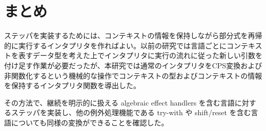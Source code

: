 \section{まとめ}
\label{section:conclusion}

ステッパを実装するためには、コンテキストの情報を保持しながら部分式を再帰的に実行するインタプリタを作ればよい。以前の研究\cite{FCA19}では言語ごとにコンテキストを表すデータ型を考えた上でインタプリタに実行の流れに従った新しい引数を付け足す作業が必要だったが、本研究では通常のインタプリタをCPS変換および非関数化するという機械的な操作でコンテキストの型およびコンテキストの情報を保持するインタプリタ関数を導出した。

その方法で、継続を明示的に扱える algebraic effect handlers を含む言語に対するステッパを実装し、他の例外処理機能である try-with や shift/reset を含む言語についても同様の変換ができることを確認した。
